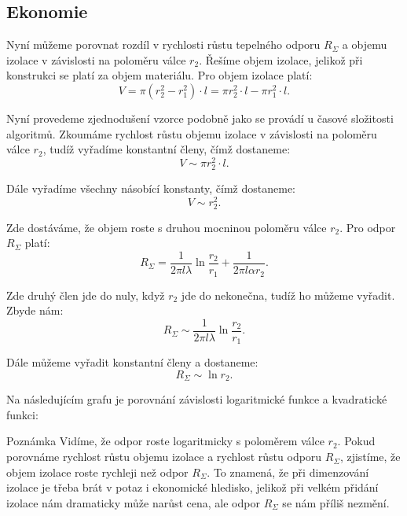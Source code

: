 \documentclass{article}
\begin{document}
\subsection{Ekonomie}

Nyní můžeme porovnat rozdíl v rychlosti růstu tepelného odporu $R_\Sigma$ a objemu izolace v závislosti na poloměru válce $r_2$. Řešíme objem izolace, jelikož při konstrukci se platí za objem materiálu. Pro objem izolace platí:
$$
    V = \pi (r_2^2 - r_1^2) \cdot l = \pi r_2^2 \cdot l - \pi r_1^2 \cdot l.
$$

Nyní provedeme zjednodušení vzorce podobně jako se provádí u časové složitosti algoritmů. Zkoumáme rychlost růstu objemu izolace v závislosti na poloměru válce $r_2$, tudíž vyřadíme konstantní členy, čímž dostaneme:
$$
    V \sim \pi r_2^2 \cdot l.
$$

Dále vyřadíme všechny násobící konstanty, čímž dostaneme:
$$
    V \sim r_2^2.
$$

Zde dostáváme, že objem roste s druhou mocninou poloměru válce $r_2$. Pro odpor $R_\Sigma$ platí:
$$
    R_\Sigma = \frac{1}{2 \pi l \lambda} \ln \frac{r_2}{r_1} + \frac{1}{2 \pi l \alpha r_2}.
$$

Zde druhý člen jde do nuly, když $r_2$ jde do nekonečna, tudíž ho můžeme vyřadit. Zbyde nám:
$$
    R_\Sigma \sim \frac{1}{2 \pi l \lambda} \ln \frac{r_2}{r_1}.
$$

Dále můžeme vyřadit konstantní členy a dostaneme:
$$
    R_\Sigma \sim \ln r_2.
$$

Na následujícím grafu je porovnání závislosti logaritmické funkce a kvadratické funkci:
\begin{center}
\end{center}

\begin{notebox}{Poznámka}
    Vidíme, že odpor roste logaritmicky s poloměrem válce $r_2$. Pokud porovnáme rychlost růstu objemu izolace a rychlost růstu odporu $R_\Sigma$, zjistíme, že objem izolace roste rychleji než odpor $R_\Sigma$. To znamená, že při dimenzování izolace je třeba brát v potaz i ekonomické hledisko, jelikož při velkém přidání izolace nám dramaticky může narůst cena, ale odpor $R_\Sigma$ se nám příliš nezmění.
\end{notebox}
\end{document}
